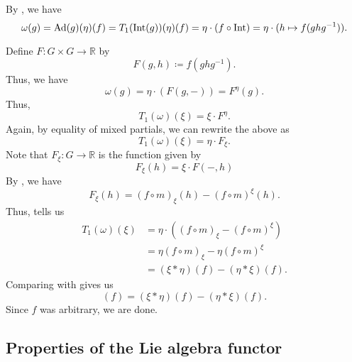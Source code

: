 \documentclass[12pt]{article}
\begin{document}
\begin{sketch}
	By , we have
	\begin{equation*} 
		\omega(g) = \operatorname{Ad}(g)(\eta)(f) = T_{1}(\operatorname{Int}(g))(\eta)(f) = \eta \cdot (f \circ \operatorname{Int}) = \eta \cdot (h \mapsto f(g h g^{-1})).
	\end{equation*}

	Define $F \colon G \times G \to \mathbb{R}$ by
	\begin{equation*} 
		F(g, h) \coloneqq f(ghg^{-1}).
	\end{equation*}
	Thus, we have
	\begin{equation*} 
		\omega(g) = \eta \cdot (F(g, -)) = F^{\eta}(g).
	\end{equation*}
	Thus,
	\begin{equation*} 
		T_{1}(\omega)(\xi) = \xi \cdot F^{\eta}.
	\end{equation*}
	Again, by equality of mixed partials, we can rewrite the above as
	\begin{equation} \label{eq:t1-omega-xi-eta-F-xi}
		T_{1}(\omega)(\xi) = \eta \cdot F_{\xi}.
	\end{equation}
	Note that $F_{\xi} \colon G \to \mathbb{R}$ is the function given by
	\begin{equation*} 
		F_{\xi}(h) = \xi \cdot F(-, h)
	\end{equation*}
	By , we have
	\begin{equation*} 
		F_{\xi}(h) = (f \circ m)_{\xi}(h) - (f \circ m)^{\xi}(h).
	\end{equation*}
	Thus,  tells us
	\begin{align*} 
		T_{1}(\omega)(\xi) &= \eta \cdot \left((f \circ m)_{\xi} - (f \circ m)^{\xi}\right) \\
		&= \eta (f \circ m)_{\xi} - \eta (f \circ m)^{\xi} \\
		&= (\xi \ast \eta)(f) - (\eta \ast \xi)(f).
	\end{align*}
	Comparing with  gives us
	\begin{equation*} 
		[\xi, \eta](f) = (\xi \ast \eta)(f) - (\eta \ast \xi)(f).
	\end{equation*}
	Since $f$ was arbitrary, we are done.
\end{sketch}

\subsection{Properties of the Lie algebra functor}
\end{document}
